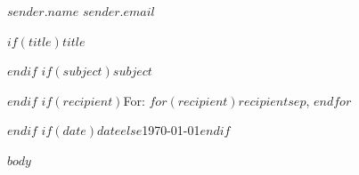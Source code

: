 \documentclass[10pt,a4paper]{article}
\begin{document}
\fontsize{10}{15}\selectfont

{\color{muted}$sender.name$ \quad\textperiodcentered\quad $sender.email$}

\vspace{1.5em}
$if(title)${\fontsize{18}{22}\selectfont $title$}\par\vspace{0.5em}$endif$
$if(subject)$$subject$\par$endif$
$if(recipient)${\color{muted}For: $for(recipient)$$recipient$$sep$, $endfor$}\par$endif$
{\color{muted}$if(date)$$date$$else$\today$endif$}

\vspace{1em}

$body$
\end{document}
